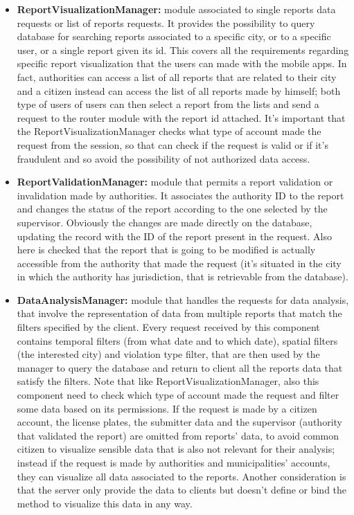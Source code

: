 \begin{itemize}
	\item \textbf{ReportVisualizationManager:}
	module associated to single reports data requests or list of reports requests. It provides the possibility to query database for searching reports associated to a specific city, or to a specific user, or a single report given its id. This covers all the requirements regarding specific report visualization that the users can made with the mobile apps. In fact, authorities can access a list of all reports that are related to their city and a citizen instead can access the list of all reports made by himself; both type of users of users can then select a report from the lists and send a request to the router module with the report id attached. It's important that the ReportVisualizationManager checks what type of account made the request from the session, so that can check if the request is valid or if it's fraudulent and so avoid the possibility of not authorized data access. 
	\item \textbf{ReportValidationManager:}
	module that permits a report validation or invalidation made by authorities. It associates the authority ID to the report and changes the status of the report according to the one selected by the supervisor. Obviously the changes are made directly on the database, updating the record with the ID of the report present in the request. Also here is checked that the report that is going to be modified is actually accessible from the authority that made the request (it's situated in the city in which the authority has jurisdiction, that is retrievable from the database).
	\item \textbf{DataAnalysisManager:}
	module that handles the requests for data analysis, that involve the representation of data from multiple reports that match the filters specified by the client. Every request received by this component contains temporal filters (from what date and to which date), spatial filters (the interested city) and violation type filter, that are then used by the manager to query the database and return to client all the reports data that satisfy the filters. Note that like ReportVisualizationManager, also this component need to check which type of account made the request and filter some data based on its permissions. If the request is made by a citizen account, the license plates, the submitter data and the supervisor (authority that validated the report) are omitted from reports' data, to avoid common citizen to visualize sensible data that is also not relevant for their analysis; instead if the request is made by authorities and municipalities' accounts, they can visualize all data associated to the reports. Another consideration is that the server only provide the data to clients but doesn't define or bind the method to visualize this data in any way.   

\end{itemize}
